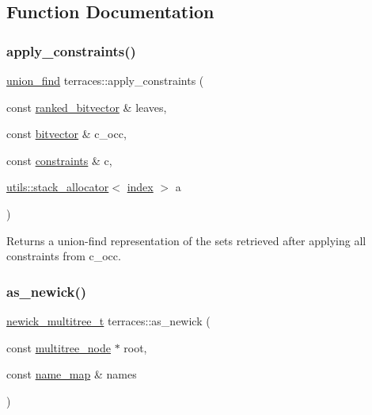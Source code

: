 \subsection{Function Documentation}
\mbox{\label{namespaceterraces_a81a42a8b470521357cd73e5b30c2ad7c}} 
\subsubsection{\texorpdfstring{apply\+\_\+constraints()}{apply\_constraints()}}
{\footnotesize\ttfamily \hyperlink{classterraces_1_1union__find}{union\+\_\+find} terraces\+::apply\+\_\+constraints (\begin{DoxyParamCaption}\item[{const \hyperlink{namespaceterraces_acc45ec9c561024c50ecbce5b6738ba08}{ranked\+\_\+bitvector} \&}]{leaves,  }\item[{const \hyperlink{namespaceterraces_a1b526fb554dff829f7ad51eb21d5ed06}{bitvector} \&}]{c\+\_\+occ,  }\item[{const \hyperlink{namespaceterraces_a6f603ffd30ed4d902fce6424492e0581}{constraints} \&}]{c,  }\item[{\hyperlink{classterraces_1_1utils_1_1stack__allocator}{utils\+::stack\+\_\+allocator}$<$ \hyperlink{namespaceterraces_adbc33ccb543d1634e96d0eb02e472c77}{index} $>$}]{a }\end{DoxyParamCaption})}

Returns a union-\/find representation of the sets retrieved after applying all constraints from c\+\_\+occ. \mbox{\label{namespaceterraces_ac1f8e7b342ecb4934d77c309c3ac8692}} 
\subsubsection{\texorpdfstring{as\+\_\+newick()}{as\_newick()}\hspace{0.1cm}{\footnotesize\ttfamily [1/2]}}
{\footnotesize\ttfamily \hyperlink{structterraces_1_1newick__multitree__t}{newick\+\_\+multitree\+\_\+t} terraces\+::as\+\_\+newick (\begin{DoxyParamCaption}\item[{const \hyperlink{structterraces_1_1multitree__node}{multitree\+\_\+node} $\ast$}]{root,  }\item[{const \hyperlink{namespaceterraces_a4ef0217fe5aed881737d9bc5a8d45dca}{name\+\_\+map} \&}]{names }\end{DoxyParamCaption})\hspace{0.3cm}{\ttfamily [inline]}}

